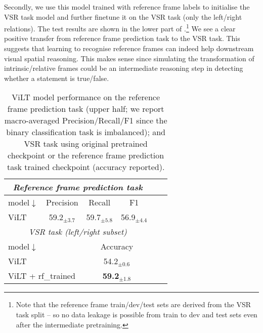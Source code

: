 Secondly, we use this model trained with reference frame labels to initialise the VSR task model and further finetune it on the VSR task (only the left/right relations). The test results are shown in the lower part of .\footnote{Note that the reference frame train/dev/test sets are derived from the VSR task split -- so no data leakage is possible from train to dev and test sets even after the intermediate pretraining.} We see a clear positive transfer from reference frame prediction task to the VSR task.
This suggests that learning to recognise reference frames can indeed help downstream visual spatial reasoning. This makes sense since simulating the transformation of intrinsic/relative frames could be an intermediate reasoning step in detecting whether a statement is true/false.


\begin{table}[]
\centering
\small
\begin{tabular}{lccccc}
\toprule
\multicolumn{4}{c}{\emph{Reference frame prediction task}} \\
\midrule
model$\downarrow$ & Precision & Recall & F1  \\
\midrule
ViLT & 59.2$_{\pm3.7}$ & 59.7$_{\pm5.8}$ & 56.9$_{\pm4.4}$ \\
\toprule
\multicolumn{4}{c}{\emph{VSR task (left/right subset)}} \\
\midrule
model$\downarrow$ &  & \multicolumn{2}{c}{Accuracy} \\
\midrule
\multicolumn{2}{l}{ViLT} & \multicolumn{2}{c}{54.2$_{\pm0.6}$} \\
\multicolumn{2}{l}{ViLT + rf\_trained} &  \multicolumn{2}{c}{\textbf{59.2}$_{\pm1.8}$} \\
\bottomrule
\end{tabular}
\caption{ViLT model performance on the reference frame prediction task (upper half; we report macro-averaged Precision/Recall/F1 since the binary classification task is imbalanced); and VSR task using original pretrained checkpoint or the reference frame prediction task trained checkpoint (accuracy reported).}
\label{table:rf}
\end{table}


